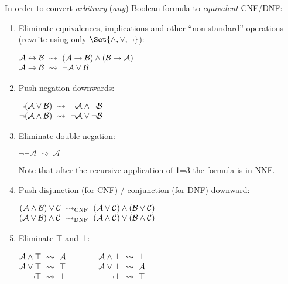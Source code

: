 \documentclass[a4paper,10pt]{article}
\begin{document}
In order to convert \emph{arbitrary} (\ie \emph{any}) Boolean formula to \emph{equivalent} CNF/DNF:
\begin{enumerate}[topsep=2pt, itemsep=2pt]
    \item Eliminate equivalences, implications and other \enquote{non-standard} operations (\ie rewrite using only $\Set{\land, \lor, \neg}$):
    \par\(\openup-\jot\begin{aligned}[t]
        \mathcal{A} \iff \mathcal{B} &~\rightsquigarrow~ (\mathcal{A} \implies \mathcal{B}) \land (\mathcal{B} \implies \mathcal{A}) \\
        \mathcal{A} \implies \mathcal{B} &~\rightsquigarrow~ \neg\mathcal{A} \lor \mathcal{B}
    \end{aligned}\)

    \item Push negation downwards:
    \par\(\openup-\jot\begin{aligned}[t]
        \neg(\mathcal{A} \lor \mathcal{B}) &~\rightsquigarrow~ \neg\mathcal{A} \land \neg\mathcal{B} \\
        \neg(\mathcal{A} \land \mathcal{B}) &~\rightsquigarrow~ \neg\mathcal{A} \lor \neg\mathcal{B}
    \end{aligned}\)

    \item Eliminate double negation:
    \par$\neg\neg\mathcal{A} ~\rightsquigarrow~ \mathcal{A}$

    Note that after the recursive application of 1\==3 the formula is in NNF.

    \item Push disjunction (for CNF) / conjunction (for DNF) downward:
    \par\(\openup-\jot\begin{aligned}[t]
        (\mathcal{A} \land \mathcal{B}) \lor \mathcal{C} ~\rightsquigarrow_{\textrm{CNF}}~ (\mathcal{A} \lor \mathcal{C}) \land (\mathcal{B} \lor \mathcal{C}) \\
        (\mathcal{A} \lor \mathcal{B}) \land \mathcal{C} ~\rightsquigarrow_{\textrm{DNF}}~ (\mathcal{A} \land \mathcal{C}) \lor (\mathcal{B} \land \mathcal{C}) \\
    \end{aligned}\)

    \item Eliminate $\top$ and $\bot$:
    \par\(\openup-\jot\begin{aligned}[t]
        \mathcal{A} \land \top &~\rightsquigarrow~ \mathcal{A} &\qquad&&
        \mathcal{A} \land \bot &~\rightsquigarrow~ \bot \\
        \mathcal{A} \lor \top &~\rightsquigarrow~ \top &\qquad&&
        \mathcal{A} \lor \bot &~\rightsquigarrow~ \mathcal{A} \\
        \neg\top &~\rightsquigarrow~ \bot &\qquad&&
        \neg\bot &~\rightsquigarrow~ \top
    \end{aligned}\)
\end{enumerate}
\end{document}
